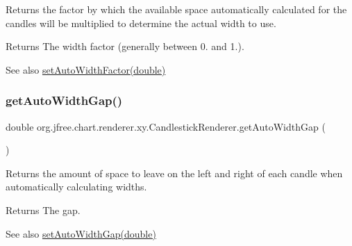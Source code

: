 Returns the factor by which the available space automatically calculated for the candles will be multiplied to determine the actual width to use.

\begin{DoxyReturn}{Returns}
The width factor (generally between 0. and 1.).
\end{DoxyReturn}
\begin{DoxySeeAlso}{See also}
\mbox{\hyperlink{classorg_1_1jfree_1_1chart_1_1renderer_1_1xy_1_1_candlestick_renderer_a0189cacb382b9e002ad932e555a79664}{set\+Auto\+Width\+Factor(double)}} 
\end{DoxySeeAlso}
\mbox{\label{classorg_1_1jfree_1_1chart_1_1renderer_1_1xy_1_1_candlestick_renderer_a43a56602a325bb287cce2fa5bb40c1a1}} 
\subsubsection{\texorpdfstring{get\+Auto\+Width\+Gap()}{getAutoWidthGap()}}
{\footnotesize\ttfamily double org.\+jfree.\+chart.\+renderer.\+xy.\+Candlestick\+Renderer.\+get\+Auto\+Width\+Gap (\begin{DoxyParamCaption}{ }\end{DoxyParamCaption})}

Returns the amount of space to leave on the left and right of each candle when automatically calculating widths.

\begin{DoxyReturn}{Returns}
The gap.
\end{DoxyReturn}
\begin{DoxySeeAlso}{See also}
\mbox{\hyperlink{classorg_1_1jfree_1_1chart_1_1renderer_1_1xy_1_1_candlestick_renderer_ae86e0bc0453129bf8579ae7a5d2ee821}{set\+Auto\+Width\+Gap(double)}} 
\end{DoxySeeAlso}
\mbox{\label{classorg_1_1jfree_1_1chart_1_1renderer_1_1xy_1_1_candlestick_renderer_aeb7c08c7e6bbdbfe7b1ef2ddbcf0ac34}} 
